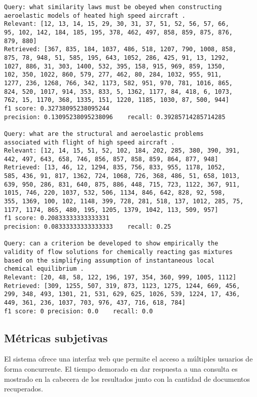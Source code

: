 \documentclass[12pt]{llncs}
\begin{document}
\begin{verbatim}
Query: what similarity laws must be obeyed when constructing
aeroelastic models of heated high speed aircraft .
Relevant: [12, 13, 14, 15, 29, 30, 31, 37, 51, 52, 56, 57, 66,
95, 102, 142, 184, 185, 195, 378, 462, 497, 858, 859, 875, 876,
879, 880]
Retrieved: [367, 835, 184, 1037, 486, 518, 1207, 790, 1008, 858,
875, 78, 948, 51, 585, 195, 643, 1052, 286, 425, 91, 13, 1292,
1027, 886, 31, 303, 1400, 532, 395, 158, 915, 969, 859, 1350,
102, 350, 1022, 860, 579, 277, 462, 80, 284, 1032, 955, 911,
1277, 236, 1268, 766, 342, 1173, 582, 951, 970, 781, 1016, 865,
824, 520, 1017, 914, 353, 833, 5, 1362, 1177, 84, 418, 6, 1073,
762, 15, 1170, 368, 1335, 151, 1220, 1185, 1030, 87, 500, 944]
f1 score: 0.32738095238095244
precision: 0.13095238095238096    recall: 0.39285714285714285

Query: what are the structural and aeroelastic problems
associated with flight of high speed aircraft .
Relevant: [12, 14, 15, 51, 52, 102, 184, 202, 285, 380, 390, 391,
442, 497, 643, 658, 746, 856, 857, 858, 859, 864, 877, 948]
Retrieved: [13, 46, 12, 1294, 835, 756, 833, 955, 1178, 1052,
585, 436, 91, 817, 1362, 724, 1068, 726, 368, 486, 51, 658, 1013,
639, 950, 286, 831, 640, 875, 886, 448, 715, 723, 1122, 367, 911,
1015, 746, 220, 1037, 532, 506, 1134, 846, 642, 828, 92, 598,
355, 1369, 100, 102, 1148, 399, 728, 281, 518, 137, 1012, 285, 75,
1177, 1174, 865, 480, 195, 1205, 1379, 1042, 113, 509, 957]
f1 score: 0.20833333333333331
precision: 0.08333333333333333    recall: 0.25

Query: can a criterion be developed to show empirically the
validity of flow solutions for chemically reacting gas mixtures
based on the simplifying assumption of instantaneous local
chemical equilibrium .
Relevant: [20, 48, 58, 122, 196, 197, 354, 360, 999, 1005, 1112]
Retrieved: [309, 1255, 507, 319, 873, 1123, 1275, 1244, 669, 456,
299, 348, 493, 1301, 21, 531, 629, 625, 1026, 539, 1224, 17, 436,
449, 361, 236, 1037, 703, 976, 437, 716, 618, 784]
f1 score: 0 precision: 0.0    recall: 0.0
\end{verbatim}


\subsection{Métricas subjetivas}

El sistema ofrece una interfaz web que permite el acceso a múltiples usuarios de forma concurrente. El tiempo demorado en dar respuesta a una consulta es mostrado en la cabecera de los resultados junto con la cantidad de documentos recuperados.
\end{document}
